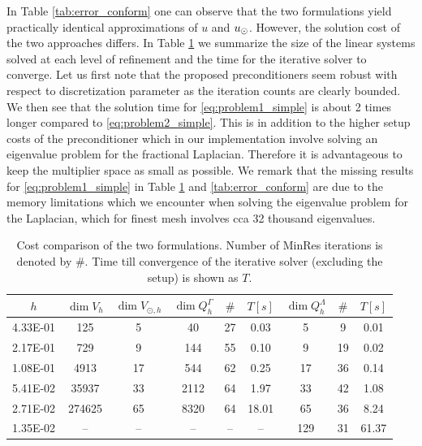 In Table \ref{tab:error_conform} one can observe that the two formulations
yield practically identical approximations of $u$ and $u_{\odot}$. However, the solution
cost of the two approaches differs. In Table \ref{tab:cost} we summarize the
size of the linear systems solved at each level of refinement and the time
for the iterative solver to converge. Let us first note that the proposed
preconditioners seem robust with respect to discretization parameter as
the iteration counts are clearly bounded. We then see that the solution
time for \eqref{eq:problem1_simple} is about 2 times longer compared to
\eqref{eq:problem2_simple}. This is in addition to the higher setup costs
of the preconditioner which in our implementation involve solving an eigenvalue
problem for the fractional Laplacian. Therefore it is advantageous to keep
the multiplier space as small as possible. We remark that the missing
results for \eqref{eq:problem1_simple} in Table \ref{tab:cost} and \ref{tab:error_conform}
are due to the memory limitations which we encounter when solving the eigenvalue problem
for the Laplacian, which for finest mesh involves cca 32 thousand eigenvalues.
%
\begin{table}
  \scriptsize{
  \begin{center}
    \begin{tabular}{c|cc|ccc|ccc}
      \hline
      $h$ & $\dim{V_h}$ & $\dim{V_{\odot, h}}$ & $\dim{Q^{\Gamma}_h}$ & $\#$ & $T\left[s\right]$ & $\dim{Q^{\Lambda}_h}$ & $\#$ & $T\left[s\right]$\\
      \hline
4.33E-01 &125    &5  &40    &27 &0.03  &5  &9  &0.01\\
2.17E-01 &729    &9  &144   &55 &0.10  &9  &19 &0.02\\
1.08E-01 &4913   &17 &544   &62 &0.25  &17 &36 &0.14\\
5.41E-02 &35937  &33 &2112  &64 &1.97  &33 &42 &1.08\\
2.71E-02 &274625 &65 &8320  &64 &18.01 &65 &36 &8.24\\
1.35E-02 &--     &-- &--    &-- &--    &129 &31 &61.37\\
\hline
    \end{tabular}
    \end{center}
    }
  \caption{Cost comparison of the two formulations. Number of MinRes iterations
    is denoted by $\#$. Time till convergence of the iterative solver (excluding the setup) is shown
    as $T$.
  }
\label{tab:cost}
\end{table}

